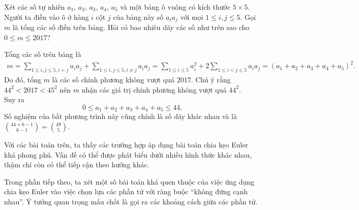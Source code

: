 \begin{bt}%
 Xét các số tự nhiên $a_1$, $a_2$, $a_3$, $a_4$, $a_5$ và một bảng ô vuông có kích thước $5 \times 5$. Người ta điền vào ô ở hàng $i$ cột $j$ của bảng này số $a_ia_j$ với mọi $1 \le i,j \le 5$. Gọi $m$ là tổng các số điền trên bảng. Hỏi có bao nhiêu dãy các số như trên sao cho $0\le m\le 2017$?
 \loigiai
 {
 Tổng các số trên bảng là
 \begin{eqnarray*}
  m=\sum\limits_{1\le i,j\le 5,i= j} a_ia_j+\sum\limits_{1\le i,j \le 5,i\neq j} a_ia_j=\sum\limits_{1\le i\le 5} a_i^2+2\sum\limits_{1\le i<j\le 5} a_ia_j=\left( a_1+a_2+a_3+a_4+a_5 \right)^2.
 \end{eqnarray*}
 Do đó, tổng $m$ là các số chính phương không vượt quá $2017$. Chú ý rằng $44^2<2017<45^2$ nên $m$ nhận các giá trị chính phương không vượt quá $44^2$.\\
 Suy ra
 \[0\le a_1+a_2+a_3+a_4+a_5\le 44.\]
 Số nghiệm của bất phương trình này cũng chính là số dãy khác nhau và là $\displaystyle {44+6-1 \choose 6-1}={49 \choose 5}$.
 \begin{nx}
  Với các bài toán trên, ta thấy các trường hợp áp dụng bài toán chia kẹo Euler khá phong phú. Vấn đề có thể được phát biểu dưới nhiều hình thức khác nhau, thậm chí còn có thể tiếp cận theo hướng khác.
 \end{nx}
 }
\end{bt}
\noindent Trong phần tiếp theo, ta xét một số bài toán khá quen thuộc của việc ứng dụng chia kẹo Euler vào việc chọn lựa các phần tử với ràng buộc ``không đứng cạnh nhau”. Ý tưởng quan trọng mấu chốt là gọi ra các khoảng cách giữa các phần tử.


